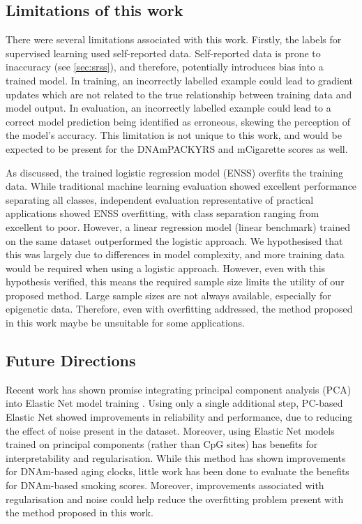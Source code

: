 \documentclass[draft]{article} %
\begin{document}
\subsection{Limitations of this work} \label{sec:limitations}
There were several limitations associated with this work. Firstly, the labels for supervised learning used self-reported data. Self-reported data is prone to inaccuracy (see
\ref{sec:srss}), and therefore, potentially introduces bias into a trained model. In training, an incorrectly labelled example could lead to gradient updates which are not related to the true relationship between training data and model output. In evaluation, an incorrectly labelled example could lead to a correct model prediction being identified as erroneous, skewing the perception of the model's accuracy. This limitation is not unique to this work, and would be expected to be present for the DNAmPACKYRS and mCigarette scores as well.

As discussed, the trained logistic regression model (ENSS) overfits the training data. While traditional machine learning evaluation showed excellent performance separating all classes, independent evaluation representative of practical applications showed ENSS overfitting, with class separation ranging from excellent to poor. However, a linear regression model (linear benchmark) trained on the same dataset outperformed the logistic approach. We hypothesised that this was largely due to differences in model complexity, and more training data would be required when using a logistic approach. However, even with this hypothesis verified, this means the required sample size limits the utility of our proposed method. Large sample sizes are not always available, especially for epigenetic data. Therefore, even with overfitting addressed, the method proposed in this work maybe be unsuitable for some applications.

\subsection{Future Directions}
Recent work has shown promise integrating principal component analysis (PCA) into Elastic Net model training \cite{higgins2022computational}. Using only a single additional step, PC-based Elastic Net showed improvements in reliability and performance, due to reducing the effect of noise present in the dataset. Moreover, using Elastic Net models trained on principal components (rather than CpG sites) has benefits for interpretability and regularisation. While this method has shown improvements for DNAm-based aging clocks, little work has been done to evaluate the benefits for DNAm-based smoking scores. Moreover, improvements associated with regularisation and noise could help reduce the overfitting problem present with the method proposed in this work.
\end{document}
